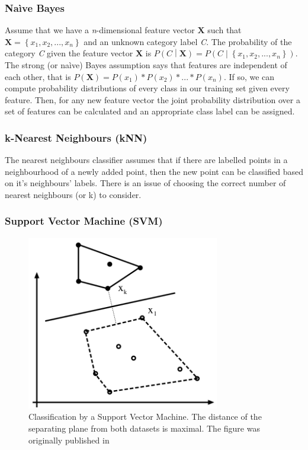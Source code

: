 	\subsubsection{Na\`ive Bayes}
	Assume that we have a \textit{n}-dimensional feature vector $\mathbf{X}$ such that $\mathbf{X} = \left\{x_1, x_2, ... , x_\mathit{n}\right\}$ and an unknown category label \textit{C}. The probability of the category \textit{C} given the feature vector \textbf{X} is $P\left(\mathit{C}\middle|\mathbf{X}\right) = P\left(\mathit{C}\middle|\left\{x_1, x_2, ..., x_\mathit{n}\right\}\right)$. The strong (or na\`ive) Bayes assumption says that features are independent of each other, that is $P(\mathbf{X}) = P(x_1)*P(x_2)*...*P(x_\mathit{n})$. If so, we can compute probability distributions of every class in our training set given every feature. Then, for any new feature vector the joint probability distribution over a set of features can be calculated and an appropriate class label can be assigned.
	
	\subsubsection{k-Nearest Neighbours (kNN)}
	The nearest neighbours classifier assumes that if there are labelled points in a neighbourhood of a newly added point, then the new point can be classified based on it's neighbours' labels. There is an issue of choosing the correct number of nearest neighbours (or k) to consider.	
	
	\subsubsection{Support Vector Machine (SVM)}
	\begin{figure}[!ht]
	\centering
	\includegraphics[width=0.75\textwidth]{../figs/svm}
	\caption{Classification by a Support Vector Machine. The distance of the separating plane from both datasets is maximal. The figure was originally published in \cite{ponce2011cv}}
	\label{fig:svm}
	\end{figure}
	
